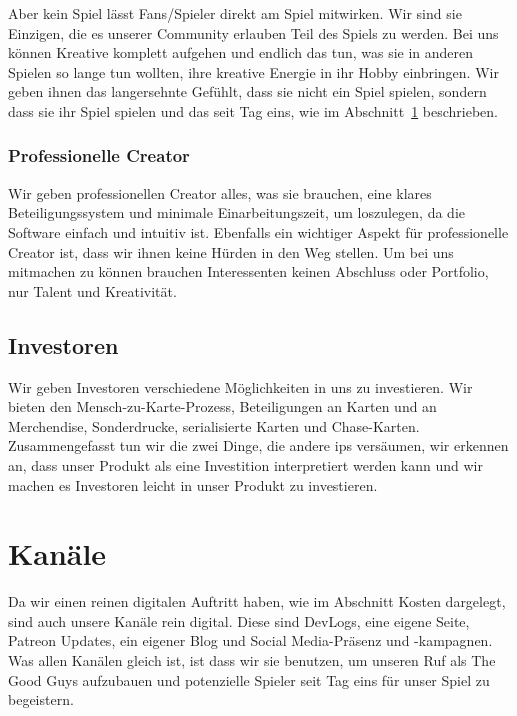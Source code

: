 \documentclass[fontsize=11, a4aper]{scrartcl}
\begin{document}
\noindent Aber kein Spiel lässt Fans/Spieler direkt am Spiel mitwirken. Wir sind sie Einzigen, die es unserer Community erlauben Teil des Spiels zu werden. Bei uns können Kreative komplett aufgehen und endlich das tun, was sie in anderen Spielen so lange tun wollten, ihre kreative Energie in ihr Hobby einbringen. Wir geben ihnen das langersehnte Gefühlt, dass sie nicht ein Spiel spielen, sondern dass sie ihr Spiel spielen und das seit Tag eins, wie im Abschnitt~\ref{sec:Kanaele} beschrieben.

\subsubsection{Professionelle Creator} \label{subsubsec:Werangebot:Professionelle_Creator}

Wir geben professionellen Creator alles, was sie brauchen, eine klares Beteiligungssystem und minimale Einarbeitungszeit, um loszulegen, da die Software einfach und intuitiv ist. Ebenfalls ein wichtiger Aspekt für professionelle Creator ist, dass wir ihnen keine Hürden in den Weg stellen. Um bei uns mitmachen zu können brauchen Interessenten keinen Abschluss oder Portfolio, nur Talent und Kreativität.

\subsection{Investoren} \label{subsec:Wertangebot:Investoren}

Wir geben Investoren verschiedene Möglichkeiten in uns zu investieren. Wir bieten den \glqq Mensch-zu-Karte-Prozess\grqq, Beteiligungen an Karten und an Merchendise, Sonderdrucke, serialisierte Karten und Chase-Karten. Zusammengefasst tun wir die zwei Dinge, die andere \acp{ip} versäumen, wir erkennen an, dass unser Produkt als eine Investition interpretiert werden kann und wir machen es Investoren leicht in unser Produkt zu investieren.

\section{Kanäle} \label{sec:Kanaele}

Da wir einen reinen digitalen Auftritt haben, wie im Abschnitt \glqq Kosten\grqq{} dargelegt, sind auch unsere Kanäle rein digital. Diese sind DevLogs, eine eigene Seite, Patreon Updates, ein eigener Blog und Social Media-Präsenz und -kampagnen. Was allen Kanälen gleich ist, ist dass wir sie benutzen, um unseren Ruf als \glqq The Good Guys\grqq{} aufzubauen und potenzielle Spieler seit Tag eins für unser Spiel zu begeistern.
\end{document}
